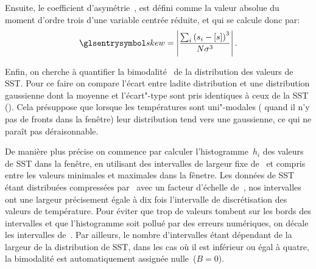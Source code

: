 Ensuite, le coefficient d'asymétrie~, est défini comme la valeur absolue du moment d'ordre trois d'une variable centrée réduite, et qui se calcule donc par:
\begin{equation}
  \am{skew} = \abs{\frac{\sum_i \paren{s_i - \moy{s}}^3} {N \sigma^3}}.
\end{equation}

Enfin, on cherche à quantifier la bimodalité~ de la distribution des valeurs de SST.
Pour ce faire on compare l'écart entre ladite distribution et une distribution gaussienne dont la moyenne et l'écart"-type sont pris identiques à ceux de la SST ().
Cela présuppose que lorsque les températures sont uni"-modales ( quand il n'y pas de fronts dans la fenêtre) leur distribution tend vers une gaussienne, ce qui ne paraît pas déraisonnable.

\begin{figure}
  \centering
  \label{fig:bimodality}
\end{figure}

De manière plus précise on commence par calculer l'histogramme~\(h_i\) des valeurs de SST dans la fenêtre, en utilisant des intervalles de largeur fixe de~ et compris entre les valeurs minimales et maximales dans la fênetre.
Les données de SST étant distribuées compressées par \footnotemark\ avec un facteur d'échelle de~, nos intervalles ont une largeur précisement égale à dix fois l'intervalle de discrétisation des valeurs de température.
Pour éviter que trop de valeurs tombent sur les bords des intervalles et que l'histogramme soit pollué par des erreurs numériques, on décale les intervalles de~.
Par ailleurs, le nombre d'intervalles étant dépendant de la largeur de la distribution de SST, dans les cas où il est inférieur ou égal à quatre, la bimodalité est automatiquement assignée nulle~(\(B=0\)).

